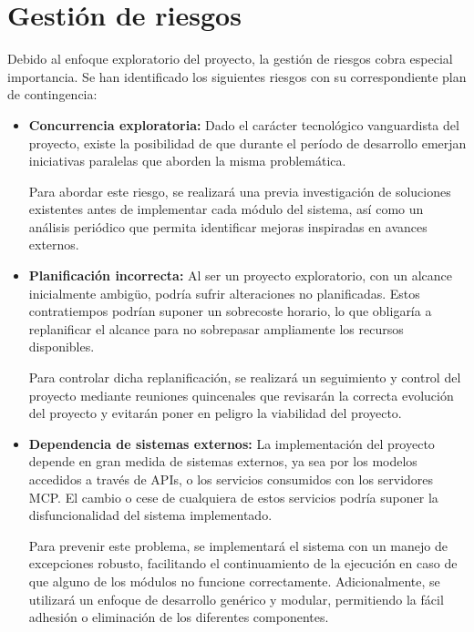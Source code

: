 \section{Gestión de riesgos}

Debido al enfoque exploratorio del proyecto, la gestión de riesgos cobra especial importancia. Se han identificado los siguientes riesgos con su correspondiente plan de contingencia: 

\begin{itemize}
  \item\textbf{Concurrencia exploratoria: }Dado el carácter tecnológico vanguardista del proyecto, existe la posibilidad de que durante el período de desarrollo emerjan iniciativas paralelas que aborden la misma problemática.  

Para abordar este riesgo, se realizará una previa investigación de soluciones existentes antes de implementar cada módulo del sistema, así como un análisis periódico que permita identificar mejoras inspiradas en avances externos.

\item\textbf{Planificación incorrecta: }Al ser un proyecto exploratorio, con un alcance inicialmente ambigüo, podría sufrir alteraciones no planificadas. Estos contratiempos podrían suponer un sobrecoste horario, lo que obligaría a replanificar el alcance para no sobrepasar ampliamente los recursos disponibles.

Para controlar dicha replanificación, se realizará un seguimiento y control del proyecto mediante reuniones quincenales que revisarán la correcta evolución del proyecto y evitarán poner en peligro la viabilidad del proyecto.



\item\textbf{Dependencia de sistemas externos: }La implementación del proyecto depende en gran medida de sistemas externos, ya sea por los modelos accedidos a través de APIs, o los servicios consumidos con los servidores MCP. El cambio o cese de cualquiera de estos servicios podría suponer la disfuncionalidad del sistema implementado.

Para prevenir este problema, se implementará el sistema con un manejo de excepciones robusto, facilitando el continuamiento de la ejecución en caso de que alguno de los módulos no funcione correctamente. Adicionalmente, se utilizará un enfoque de desarrollo genérico y modular, permitiendo la fácil adhesión o eliminación de los diferentes componentes.


\end{itemize}
